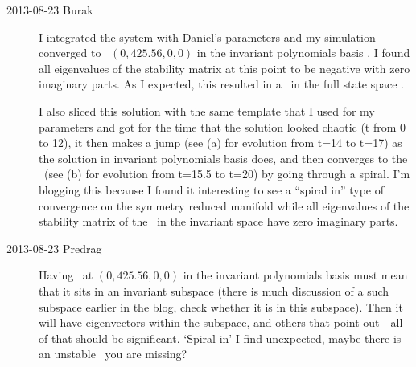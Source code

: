 \begin{description}
\item[2013-08-23 Burak] I integrated the system with Daniel's parameters and my simulation converged to \eqv\ $(0,425.56,0,0)$ in the invariant polynomials basis
. I found all eigenvalues of the stability matrix at this point to be negative with zero imaginary parts. As I expected, this resulted in a \reqv\ in the full state space
.

I also sliced this solution with the same template that I used for my
parameters and got  for the
time that the solution looked chaotic (t from 0 to 12), it then makes
a jump (see  (a) for evolution
from t=14 to t=17) as the solution in invariant polynomials basis
does, and then converges to the \reqv\ (see
 (b) for evolution from t=15.5
to t=20) by going through a spiral.
I'm blogging this because I found
it interesting to see a ``spiral in'' type of convergence on the
symmetry reduced manifold while all eigenvalues of the stability
matrix of the \eqv\ in the invariant space have zero imaginary
parts.

\item[2013-08-23 Predrag] Having \eqv\ at $(0,425.56,0,0)$ in the
invariant polynomials basis must mean that it sits in an invariant
subspace (there is much discussion of a such subspace earlier in the
blog, check whether it is in this subspace). Then it will have
eigenvectors within the subspace, and others that point out - all of
that should be significant. `Spiral in' I find unexpected, maybe
there is an unstable \eqv\ you are missing?


\end{description}
